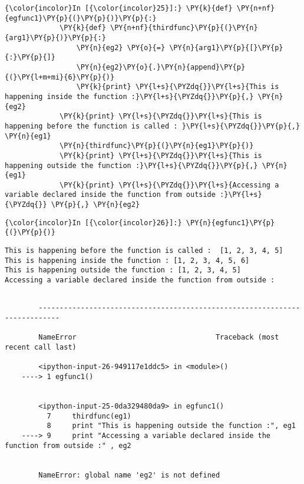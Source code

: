     \begin{Verbatim}[commandchars=\\\{\}]
{\color{incolor}In [{\color{incolor}25}]:} \PY{k}{def} \PY{n+nf}{egfunc1}\PY{p}{(}\PY{p}{)}\PY{p}{:}
             \PY{k}{def} \PY{n+nf}{thirdfunc}\PY{p}{(}\PY{n}{arg1}\PY{p}{)}\PY{p}{:}
                 \PY{n}{eg2} \PY{o}{=} \PY{n}{arg1}\PY{p}{[}\PY{p}{:}\PY{p}{]}
                 \PY{n}{eg2}\PY{o}{.}\PY{n}{append}\PY{p}{(}\PY{l+m+mi}{6}\PY{p}{)}
                 \PY{k}{print} \PY{l+s}{\PYZdq{}}\PY{l+s}{This is happening inside the function :}\PY{l+s}{\PYZdq{}}\PY{p}{,} \PY{n}{eg2} 
             \PY{k}{print} \PY{l+s}{\PYZdq{}}\PY{l+s}{This is happening before the function is called : }\PY{l+s}{\PYZdq{}}\PY{p}{,} \PY{n}{eg1}
             \PY{n}{thirdfunc}\PY{p}{(}\PY{n}{eg1}\PY{p}{)}
             \PY{k}{print} \PY{l+s}{\PYZdq{}}\PY{l+s}{This is happening outside the function :}\PY{l+s}{\PYZdq{}}\PY{p}{,} \PY{n}{eg1}   
             \PY{k}{print} \PY{l+s}{\PYZdq{}}\PY{l+s}{Accessing a variable declared inside the function from outside :}\PY{l+s}{\PYZdq{}} \PY{p}{,} \PY{n}{eg2}
\end{Verbatim}

    \begin{Verbatim}[commandchars=\\\{\}]
{\color{incolor}In [{\color{incolor}26}]:} \PY{n}{egfunc1}\PY{p}{(}\PY{p}{)}
\end{Verbatim}

    \begin{Verbatim}[commandchars=\\\{\}]
This is happening before the function is called :  [1, 2, 3, 4, 5]
This is happening inside the function : [1, 2, 3, 4, 5, 6]
This is happening outside the function : [1, 2, 3, 4, 5]
Accessing a variable declared inside the function from outside :
    \end{Verbatim}

    \begin{Verbatim}[commandchars=\\\{\}]

        ---------------------------------------------------------------------------

        NameError                                 Traceback (most recent call last)

        <ipython-input-26-949117e1ddc5> in <module>()
    ----> 1 egfunc1()
    

        <ipython-input-25-0da329480da9> in egfunc1()
          7     thirdfunc(eg1)
          8     print "This is happening outside the function :", eg1
    ----> 9     print "Accessing a variable declared inside the function from outside :" , eg2
    

        NameError: global name 'eg2' is not defined

    \end{Verbatim}

